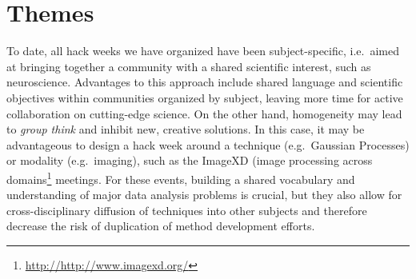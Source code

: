 \section*{Themes}

To date, all hack weeks we have organized have been subject-specific, i.e.\ aimed at bringing together a community with a shared scientific interest, such as neuroscience.
Advantages to this approach include shared language and scientific objectives within communities organized by subject, leaving more time for active collaboration on cutting-edge science.
On the other hand, homogeneity may lead to \textit{group think} and inhibit new, creative solutions. 
In this case, it may be advantageous to design a hack week around a technique (e.g.\ Gaussian Processes) or modality (e.g.\ imaging), such as the ImageXD (image processing across domains\footnote{\url{http://http://www.imagexd.org/}} meetings. 
For these events, building a shared vocabulary and understanding of major data analysis problems is crucial, but they also allow for cross-disciplinary diffusion of techniques into other subjects and therefore decrease the risk of duplication of method development efforts.
